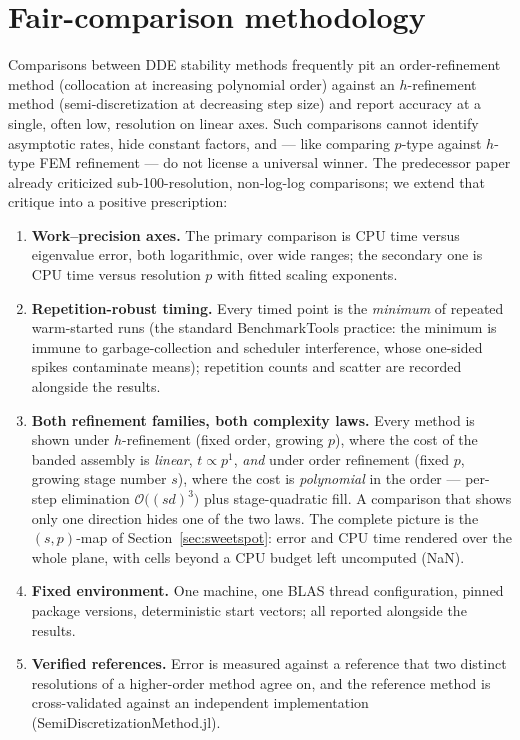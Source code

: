 \documentclass[Afour,sageh,times]{sagej}
\begin{document}
\section{Fair-comparison methodology}
\label{sec:fair}

Comparisons between DDE stability methods frequently pit an order-refinement
method (collocation at increasing polynomial order) against an $h$-refinement
method (semi-discretization at decreasing step size) and report accuracy at a
single, often low, resolution on linear axes. Such comparisons cannot
identify asymptotic rates, hide constant factors, and --- like comparing
$p$-type against $h$-type FEM refinement --- do not license a universal
winner. The predecessor paper \citep{Bachrathy2026} already criticized
sub-100-resolution, non-log-log comparisons; we extend that critique into a
positive prescription:

\begin{enumerate}
  \item \textbf{Work--precision axes.} The primary comparison is CPU time
        versus eigenvalue error, both logarithmic, over wide ranges; the
        secondary one is CPU time versus resolution $p$ with fitted scaling
        exponents.
  \item \textbf{Repetition-robust timing.} Every timed point is the
        \emph{minimum} of repeated warm-started runs (the standard
        BenchmarkTools practice: the minimum is immune to garbage-collection
        and scheduler interference, whose one-sided spikes contaminate
        means); repetition counts and scatter are recorded alongside the
        results.
  \item \textbf{Both refinement families, both complexity laws.} Every
        method is shown under $h$-refinement (fixed order, growing $p$),
        where the cost of the banded assembly is \emph{linear},
        $t \propto p^{1}$, \emph{and} under order refinement (fixed $p$,
        growing stage number $s$), where the cost is \emph{polynomial} in
        the order --- per-step elimination $\mathcal{O}\bigl((sd)^3\bigr)$
        plus stage-quadratic fill. A comparison that shows only one
        direction hides one of the two laws. The complete picture is the
        $(s, p)$-map of Section~\ref{sec:sweetspot}: error and CPU time
        rendered over the whole plane, with cells beyond a CPU budget left
        uncomputed (NaN).
  \item \textbf{Fixed environment.} One machine, one BLAS thread
        configuration, pinned package versions, deterministic start vectors;
        all reported alongside the results.
  \item \textbf{Verified references.} Error is measured against a reference
        that two distinct resolutions of a higher-order method agree on, and
        the reference method is cross-validated against an independent
        implementation (\textsf{SemiDiscretizationMethod.jl}).
\end{enumerate}
\end{document}
